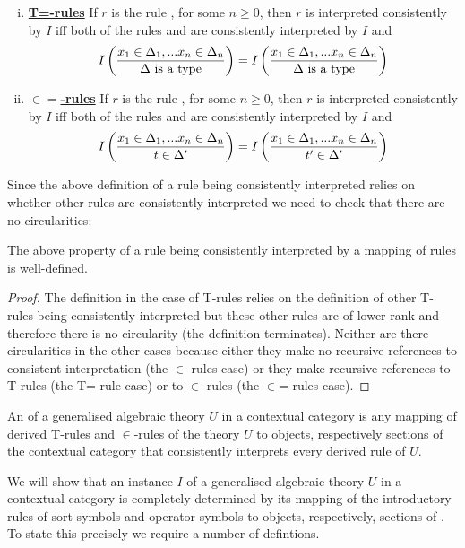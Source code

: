 \begin{numbereddefinition}
\begin{enumerate}[(i)]
\item \underline{\textbf{T=-rules}} 
If $r$ is the rule  , for some $n \geq 0$, 
then $r$ is interpreted consistently by $I$ iff
both of the rules \ZDelta and \ZDeltap
are consistently interpreted by $I$ and
$$
I\left(\frac{x_1 \in \Delta_1,... x_{n} \in \Delta_{n}}{\Delta\mbox{ is a type}}\right) = I\left(\frac{x_1 \in \Delta_1,... x_{n} \in \Delta_{n}}{\Delta\mbox{ is a type}}\right)
$$
 
\item \underline{\textbf{$\in=$-rules}} 
If $r$ is the rule  , for some $n \geq 0$, 
then $r$ is interpreted consistently by $I$ iff
both of the rules \ZtDelta and 
are consistently interpreted by $I$ and
$$
I\left(\frac{x_1 \in \Delta_1,... x_{n} \in \Delta_{n}}{t \in \Delta'}\right) = I\left(\frac{x_1 \in \Delta_1,... x_{n} \in \Delta_{n}}{t' \in \Delta'}\right)
$$
\end{enumerate}
\end{numbereddefinition}


Since the above definition of a rule being consistently interpreted relies on whether other rules are consistently interpreted we need to check that there are no circularities:
\begin{lemma}
The above property of a rule being consistently interpreted by a mapping of rules is well-defined. 
\end{lemma}
\begin{proof}
The definition in the case of T-rules relies on the definition of other T-rules being consistently interpreted but these other rules are of lower rank and therefore there is no circularity 
(the definition terminates).
Neither are there circularities in the other cases because either they make no recursive references to consistent interpretation (the $\in$-rules case)
or they make recursive references to T-rules (the T=-rule case) or to $\in$-rules (the $\in$=-rules case).
\end{proof}



\begin{definition}
An  of a generalised algebraic theory $U$ in a contextual category \catcw is  any mapping 
of derived T-rules and $\in$-rules of the theory $U$ to objects, respectively sections of the contextual category \catcw that
consistently interprets every derived rule of $U$.
\end{definition}

We will show that an instance $I$ of a generalised algebraic theory $U$ in a contextual category \catcw is
completely determined by its mapping of the introductory rules of sort symbols and operator symbols to
objects, respectively, sections of \catc. To state this precisely  we require a number of defintions.

